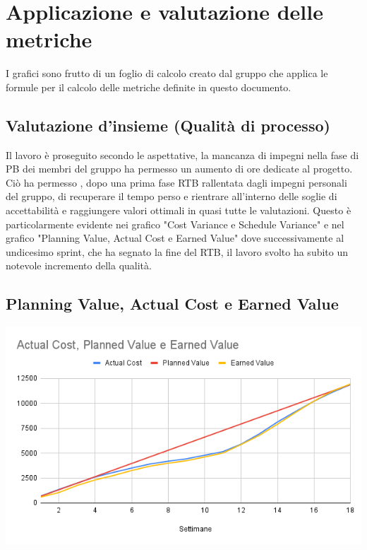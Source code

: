 \documentclass[12pt]{article}
\begin{document}
\section {Applicazione e valutazione delle metriche}
I grafici sono frutto di un foglio di calcolo creato dal gruppo che applica le formule per il calcolo delle metriche definite in questo documento.

\subsection{Valutazione d’insieme (Qualità di processo)}
Il lavoro è proseguito secondo le aspettative, la mancanza di impegni nella fase di PB dei membri del gruppo ha permesso un aumento di ore dedicate al progetto.
 Ciò ha permesso , dopo una prima fase RTB rallentata dagli impegni personali del gruppo, di recuperare il tempo perso e rientrare all'interno delle soglie di accettabilità e raggiungere valori ottimali in quasi tutte le valutazioni.
Questo è particolarmente evidente nei grafico "Cost Variance e Schedule Variance" e nel grafico "Planning Value, Actual Cost e Earned Value" dove successivamente al undicesimo sprint, che ha segnato la fine del RTB, il lavoro svolto ha subito un notevole incremento della qualità.
\subsection{Planning Value, Actual Cost e Earned Value}
\begin{center}
	\includegraphics[scale=0.5]{AC_PV_EV.png}
\end{center}
\end{document}
